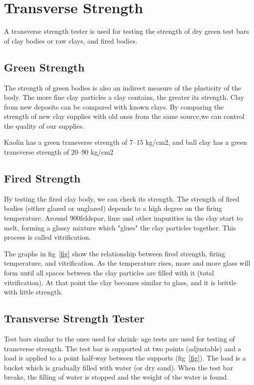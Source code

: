 \section{Transverse Strength}
A transverse strength tester is used for testing the strength of dry green test 
bars of clay bodies or raw clays, and fired bodies.
\subsection{Green Strength}
The strength of green bodies is also an indirect measure of the plasticity of 
the body. The more fine clay particles a clay contains, the greater its 
strength. Clay from new deposits can be compared with known clays. By comparing 
the strength of new clay supplies with old ones from the same source,we can 
control the quality of our supplies.

Kaolin has a green transverse strength of 7--15 kg/cm$2$, and ball clay has a 
green transverse strength of 20--90 kg/cm$2$
\subsection{Fired Strength}
By testing the fired clay body, we can check its strength. The strength of 
fired bodies (either glazed or unglazed) depends to a high degree on the 
firing temperature. Around 900\degreeC feldspar, lime and other impurities in 
the clay start to melt, forming a glassy mixture which "glues" the clay 
particles together. This process is called vitrification.

The graphs in fig~\ref{fig} show the relationship between fired strength, 
firing temperature, and vitrification. As the temperature rises, more and more 
glass will form until all spaces between the clay particles are filled with it 
(total vitrification). At that point the clay becomes similar to glass, and it 
is brittle with little strength.
\subsection{Transverse Strength Tester}
Test bars similar to the ones used for shrink- age tests are used for testing 
of transverse strength. The test bar is supported at two points (adjustable) 
and a load is applied to a point half-way between the supports (fig~\ref{fig}). 
The load is a bucket which is gradually filled with water (or dry sand). When 
the test bar breaks, the filling of water is stopped and the weight of the 
water is found.

